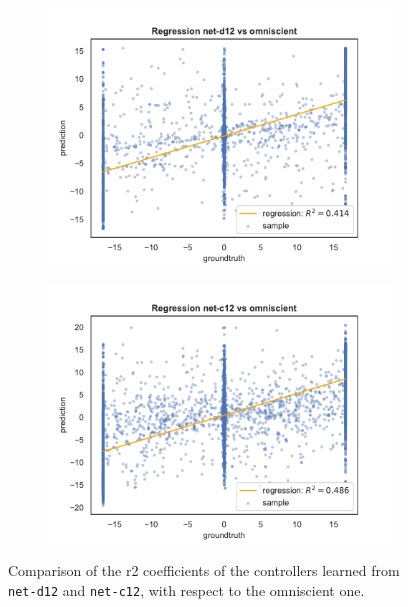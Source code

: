 \begin{figure}[!htb]
	\begin{center}
		\begin{subfigure}[h]{0.49\textwidth}
			\includegraphics[width=\textwidth]{contents/images/net-d12/regression-net-d12-vs-omniscient}%
		\end{subfigure}
		\hfill\vspace{-0.5cm}
		\begin{subfigure}[h]{0.49\textwidth}
			\includegraphics[width=\textwidth]{contents/images/net-c12/regression-net-c12-vs-omniscient}%
		\end{subfigure}
	\end{center}
	\caption[Evaluation of the \gls{r2} coefficients of \texttt{net-c12}.]{Comparison 
		of the \gls{r2} coefficients of the controllers learned from 
		\texttt{net-d12} and \texttt{net-c12}, with respect to the omniscient one.}
	\label{fig:net-c12r2}
\end{figure}
